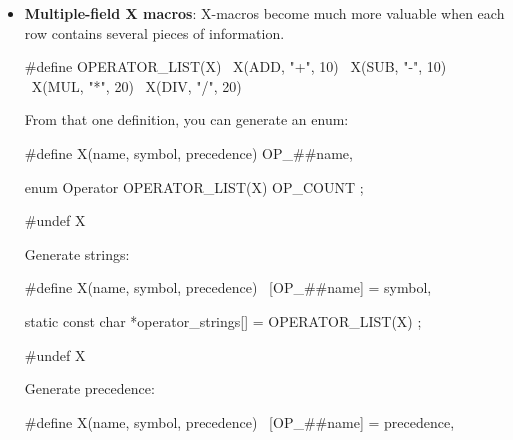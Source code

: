 \documentclass{report}
\begin{document}
\begin{itemize}
\begin{cppcode}
                    #undef MAKE_STRING
                \end{cppcode}
                \bigbreak \noindent 
                Which expands to 
                \bigbreak \noindent 
                \begin{cppcode}
                    const char *token_names[] = {
                        [TOKEN_INT]   = "INT",
                        [TOKEN_REAL]  = "REAL",
                        [TOKEN_PLUS]  = "PLUS",
                        [TOKEN_MINUS] = "MINUS",
                    };
                \end{cppcode}
            \item \textbf{Multiple-field X macros}: X-macros become much more valuable when each row contains several pieces of information.
                \bigbreak \noindent 
                \begin{cppcode}
                    #define OPERATOR_LIST(X)             \
                    X(ADD, "+", 10)                      \
                    X(SUB, "-", 10)                      \
                    X(MUL, "*", 20)                      \
                    X(DIV, "/", 20)
                \end{cppcode}
                \bigbreak \noindent 
                From that one definition, you can generate an enum:
                \bigbreak \noindent 
                \begin{cppcode}
                    #define X(name, symbol, precedence) OP_##name,

                    enum Operator {
                        OPERATOR_LIST(X)
                        OP_COUNT
                    };

                    #undef X
                \end{cppcode}
                \bigbreak \noindent 
                Generate strings:
                \bigbreak \noindent 
                \begin{cppcode}
                    #define X(name, symbol, precedence) \
                        [OP_##name] = symbol,

                    static const char *operator_strings[] = {
                        OPERATOR_LIST(X)
                    };

                    #undef X
                \end{cppcode}
                \bigbreak \noindent 
                Generate precedence:
                \bigbreak \noindent 
                \begin{cppcode}
                    #define X(name, symbol, precedence) \
                        [OP_##name] = precedence,


\end{cppcode}
\end{itemize}
\end{document}
